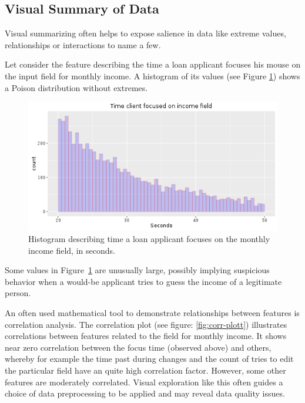 \subsection{Visual Summary of Data}\label{Ch:2:VSummary} 
Visual summarizing often helps to expose salience in data like extreme values, relationships or interactions to name a few. 

Let consider the feature describing the time a loan applicant focuses his mouse on the input field for monthly income.  A histogram of its values (see Figure \ref{fig:time-focused}) shows a Poison distribution without extremes. 
\begin{figure}[h!]
    \centering
    \includegraphics[scale=0.6]{Graphics/time_client_on_income.png}
    \caption{Histogram describing time a loan applicant focuses on the monthly income field, in seconds.}
    \label{fig:time-focused}
\end{figure}

Some values in Figure~\ref{fig:time-focused} are unusually large, possibly implying suspicious behavior when a would-be applicant tries to guess the income of a legitimate person.

An often used mathematical tool to demonstrate relationships between features is correlation analysis. The correlation plot (see figure: \ref{fig:corr-plott}) illustrates correlations between features related to the field for monthly income.  It shows near zero correlation between the focus time (observed above) and others, whereby for example the time past during changes and the count of tries to edit the particular field have an quite high correlation factor. However, some other features are moderately correlated. Visual exploration like this often guides a choice of data preprocessing to be applied and may reveal data quality issues.

